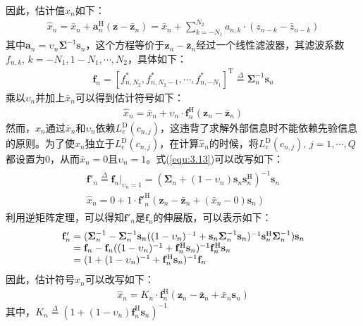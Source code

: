 因此，估计值$\hat{x}_n$如下：
\begin{eqnarray}
    \hat{x}_n=\bar{x}_n+\mathbf{a}_n^{\mathrm{H}}(\mathbf{z}-\bar{\mathbf{z}}_n)=\bar{x}_n+\sum_{k=-N_1}^{N_2}a_{n,k}\cdot(z_{n-k}-\bar{z}_{n-k})
    \label{equ:3.11}
\end{eqnarray}
其中$\mathbf{a}_n=\upsilon_n\boldsymbol{\Sigma}^{-1}\mathbf{s}_n$，这个方程等价于$\mathbf{z}_n-\bar{\mathbf{z}}_n$经过一个线性滤波器，其滤波系数$f_{n,k},\,k=-N_1,1-N_1,\cdots,N_2$，具体如下：
\begin{eqnarray}
    \mathbf{f}_n=[f_{n,N_2}^*,f_{n,N_2-1}^*,\cdots,f_{n,-N_1}^*]^{\mathrm{T}}\overset{\Delta}{=}\boldsymbol{\Sigma}_n^{-1}\mathbf{s}_n
    \label{equ:3.12}
\end{eqnarray}
乘以$\upsilon_n$并加上$\bar{x}_n$可以得到估计符号如下：
\begin{eqnarray}
    \hat{x}_n=\bar{x}_n+\upsilon_n\cdot\mathbf{f}_n^{\mathrm{H}}(\mathbf{z}_n-\bar{\mathbf{z}}_n)
    \label{equ:3.13}
\end{eqnarray}
然而，$\hat{x}_n$通过$\bar{x}_n$和$\upsilon_n$依赖$L_e^{\mathrm{D}}(c_{n,j})$，这违背了求解外部信息时不能依赖先验信息的原则。为了使$\hat{x}_n$独立于$L_e^{\mathrm{D}}(c_{n,j})$，在计算$\hat{x}_n$的时候，将$L_e^{\mathrm{D}}(c_{n,j}),\,j=1,\cdots,Q$都设置为$0$，从而$\bar{x}_n=0$且$\upsilon_n=1$。式(\ref{equ:3.13})可以改写如下：
\begin{eqnarray}
    \begin{array}{c}
    {\mathbf{f}}'_n\overset{\Delta}{=}\mathbf{f}_n|_{\upsilon_n=1}=(\boldsymbol{\Sigma}_n+(1-\upsilon_n)\mathbf{s}_n\mathbf{s}_n^{\mathrm{H}})^{-1}\mathbf{s}_n\\
    \hat{x}_n=0+1\cdot{{\mathbf{f}}'}_n^{\mathrm{H}}(\mathbf{z}_n-\bar{\mathbf{z}}_n+(\bar{x}_n-0)\mathbf{s}_n)
\end{array}
    \label{equ:3.14}
\end{eqnarray}
利用逆矩阵定理，可以得知${\mathbf{f}}'_n$是$\mathbf{f}_n$的伸展版，可以表示如下：
\begin{eqnarray}
    \begin{array}{l@{\;=\;}l}
        {\mathbf{f}}'_n&(\boldsymbol{\Sigma}_n^{-1}-\boldsymbol{\Sigma}_n^{-1}\mathbf{s}_n((1-\upsilon_n)^{-1}+\mathbf{s}_n\boldsymbol{\Sigma}_n^{-1}\mathbf{s}_n)^{-1}\mathbf{s}_n^{\mathrm{H}}\boldsymbol{\Sigma}_n^{-1})\mathbf{s}_n\\
        &\mathbf{f}_n-\mathbf{f}_n((1-\upsilon_n)^{-1}+\mathbf{f}_n^{\mathrm{H}}\mathbf{s}_n)^{-1}\mathbf{f}_n^{\mathrm{H}}\mathbf{s}_n\\
        &(1+(1-\upsilon_n)^{-1}+\mathbf{f}_n^{\mathrm{H}}\mathbf{s}_n)^{-1}\mathbf{f}_n
    \end{array}
    \label{equ:3.15}
\end{eqnarray}
因此，估计符号$\hat{x}_n$可以改写如下：
\begin{eqnarray}
    \hat{x}_n=K_n\cdot\mathbf{f}_n^{\mathrm{H}}(\mathbf{z}_n-\bar{\mathbf{z}}_n+\bar{x}_n\mathbf{s}_n)
    \label{equ:3.16}
\end{eqnarray}
其中，$K_n\overset{\Delta}{=}(1+(1-\upsilon_n)\mathbf{f}_n^{\mathrm{H}}\mathbf{s}_n)^{-1}$
